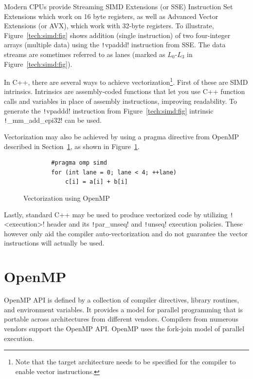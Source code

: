 \documentclass[thesis=M,english]{FITthesis}[2019/12/23]
\newcommand{\csre}[1]{\texttt!#1!}
\begin{document}
Modern CPUs provide Streaming SIMD Extensions (or SSE) Instruction Set Extensions which work on 16 byte
registers, as well as Advanced Vector Extensions (or AVX), which work with 32-byte registers.
To illustrate, Figure~\ref{tech:simd:fig} shows addition (single instruction) of two
four-integer arrays (multiple data) using the \csre{vpaddd} instruction from SSE\@. The data streams
are sometimes referred to as lanes (marked as \(L_0\)-\(L_3\) in Figure~\ref{tech:simd:fig}).

In C++, there are several ways to achieve vectorization\footnote{Note that the target architecture needs
    to be specified for the compiler to enable vector instructions.}.
First of these are SIMD intrinsics. Intrinsics
are assembly-coded functions that let you use C++ function calls and variables in place of assembly
instructions, improving readability. To generate the \csre{vpaddd} instruction from Figure~\ref{tech:simd:fig}
intrinsic \csre{_mm_add_epi32} can be used.

Vectorization may also be achieved by using a pragma directive from OpenMP described in Section~\ref{tech:omp},
as shown in Figure~\ref{tech:simd:omp}.

\begin{figure}[htp]
    \centering
    \begin{verbatim}
        #pragma omp simd
        for (int lane = 0; lane < 4; ++lane)
            c[i] = a[i] + b[i]
    \end{verbatim}
    \caption{Vectorization using OpenMP}\label{tech:simd:omp}
\end{figure}

Lastly, standard C++ may be used to produce vectorized code by utilizing \csre{<execution>} header
and its \csre{par_unseq} and \csre{unseq} execution policies. These however only aid the compiler
auto-vectorization and do not guarantee the vector instructions will actually be used.


\section{OpenMP}\label{tech:omp}

OpenMP API is defined by a collection of compiler directives, library routines, and environment variables.
It provides a model for parallel programming that is portable across architectures
from different vendors. Compilers from numerous vendors support the OpenMP API\cite{openmp18}.
OpenMP uses the fork-join model of parallel execution.
\end{document}
